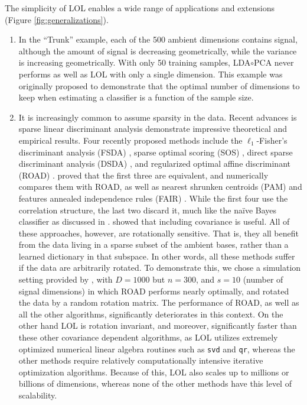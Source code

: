 \documentclass[10pt]{article}
\begin{document}
The simplicity of LOL enables a wide range of applications and extensions (Figure \ref{fig:generalizations}).  
\begin{enumerate}
	\item In the ``Trunk'' example, each of the 500 ambient dimensions contains signal, although the amount of signal is decreasing geometrically, while the variance is increasing geometrically.  With only 50 training samples, LDA$\circ$PCA never performs as well as LOL with only a single dimension. This example was originally proposed to demonstrate that the optimal number of dimensions to keep when estimating a classifier is a function of the sample size.  
	\item It is increasingly common to assume sparsity in the data.  Recent advances is sparse linear discriminant analysis demonstrate impressive theoretical and empirical results.  Four recently proposed methods include the $\ell_1$-Fisher's discriminant analysis (FSDA) \cite{Wu2008}, sparse optimal scoring  (SOS) \cite{Clemmensen2011}, direct sparse discriminant analysis (DSDA) \cite{Mai2012}, and regularized optimal affine discriminant (ROAD) \cite{Fan2012}.  \cite{MaiZou2013} proved that the first three are equivalent, and \cite{Mai2013} numerically compares them with ROAD, as well as nearest shrunken centroids (PAM) \cite{Tibshirani2002} and features annealed independence rules (FAIR) \cite{FanFan2008}.   While the first four use the correlation structure, the last two discard it, much like the na\"ive Bayes classifier as discussed in \cite{BickelLevina2004}.  \cite{Mai2013} showed that including covariance is useful.  All of these approaches, however, are rotationally sensitive.  That is, they all benefit from the data living in a sparse subset of the ambient bases, rather than a learned dictionary in that subspace.  In other words, all these methods suffer if the data are arbitrarily rotated.  To demonstrate this, we chose a simulation setting provided by \cite{Fan2012}, with $D=1000$ but $n=300$, and $s=10$ (number of signal dimensions) in which ROAD performs nearly optimally, and rotated the data by a random rotation matrix.  The performance of ROAD, as well as all the other algorithms, significantly deteriorates in this context.  On the other hand LOL is rotation invariant, and moreover, significantly faster than these other covariance dependent algorithms, as LOL utilizes extremely optimized numerical linear algebra routines such as \texttt{svd} and \texttt{qr}, whereas the other methods require relatively computationally intensive iterative optimization algorithms.  Because of this, LOL also scales up to millions or billions of dimensions, whereas none of the other methods have this level of scalability. 

\end{enumerate}
\end{document}
